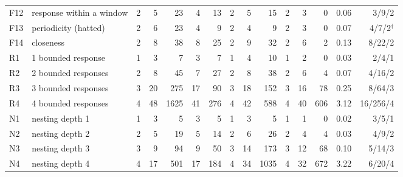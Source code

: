 \begin{table}[t]
\begin{tabular}{@{}llrrrrrrrrrrrrr@{}}
F12 & response within a window & 2 & 5 & 23 & 4 & 13 & 2 & 5 & 15 & 2 & 3 & 0 & 0.06 & 3/9/2\\
F13 & periodicity (hatted) & 2 & 6 & 23 & 4 & 9 & 2 & 4 & 9 & 2 & 3 & 0 & 0.07 & 4/7/2$^\dagger$\\
F14 & closeness & 2 & 8 & 38 & 8 & 25 & 2 & 9 & 32 & 2 & 6 & 2 & 0.13 & 8/22/2\\
R1 & 1 bounded response & 1 & 3 & 7 & 3 & 7 & 1 & 4 & 10 & 1 & 2 & 0 & 0.03 & 2/4/1\\
R2 & 2 bounded responses & 2 & 8 & 45 & 7 & 27 & 2 & 8 & 38 & 2 & 6 & 4 & 0.07 & 4/16/2\\
R3 & 3 bounded responses & 3 & 20 & 275 & 17 & 90 & 3 & 18 & 152 & 3 & 16 & 78 & 0.25 & 8/64/3\\
R4 & 4 bounded responses & 4 & 48 & 1625 & 41 & 276 & 4 & 42 & 588 & 4 & 40 & 606 & 3.12 & 16/256/4\\
N1 & nesting depth 1 & 1 & 3 & 5 & 3 & 5 & 1 & 3 & 5 & 1 & 1 & 0 & 0.02 & 3/5/1\\
N2 & nesting depth 2 & 2 & 5 & 19 & 5 & 14 & 2 & 6 & 26 & 2 & 4 & 4 & 0.03 & 4/9/2\\
N3 & nesting depth 3 & 3 & 9 & 94 & 9 & 50 & 3 & 14 & 173 & 3 & 12 & 68 & 0.10 & 5/14/3\\
N4 & nesting depth 4 & 4 & 17 & 501 & 17 & 184 & 4 & 34 & 1035 & 4 & 32 & 672 & 3.22 & 6/20/4\\
\bottomrule
\end{tabular}
\end{table}
